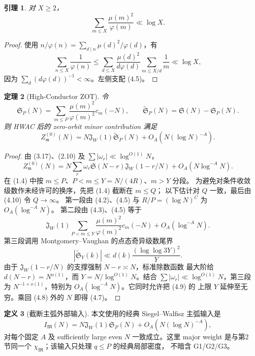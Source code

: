 \documentclass[11pt,a4paper]{ctexart}
\newtheorem{theorem}{定理}[section]
\newtheorem{lemma}[theorem]{引理}
\theoremstyle{definition}
\newtheorem{definition}[theorem]{定义}
\newcommand{\1}{\mathbf 1}
\begin{document}
\begin{lemma}
对 $X\ge2$，
\[
\sum_{m\le X}\frac{\mu(m)^2}{\varphi(m)}\ll\log X.     \tag{4.5}
\]
\end{lemma}

\begin{proof}
使用 $n/\varphi(n)=\sum_{d\mid n}\mu(d)^2/\varphi(d)$，有
\[
\sum_{n\le X}\frac1{\varphi(n)}
\le\sum_{d\le X}\frac{\mu(d)^2}{d\varphi(d)}
\sum_{m\le X/d}\frac1m\ll\log X,
\]
因为 $\sum_d(d\varphi(d))^{-1}<\infty$。左侧支配 (4.5)。
\end{proof}

\begin{theorem}[High-Conductor ZOT]
令
\[
\mathfrak S_P(N)=\sum_{m\le P}\frac{\mu(m)^2}{\varphi(m)^2}c_m(-N),
\qquad
\widetilde{\mathfrak S}_P(N)=\mathfrak S(N)-\mathfrak S_P(N). \tag{4.6}
\]
则 HWAC 后的 zero-orbit minor contribution 满足
\[
\boxed{
Z_{\mathfrak m}^{(0)}(N)
=N\mathfrak J_W(1)\widetilde{\mathfrak S}_P(N)
+O_A(N(\log N)^{-A}).}                                 \tag{4.7}
\]
\end{theorem}

\begin{proof}
由 (3.17)、(2.10) 及 $\sum|\omega_r|\ll\log^{O(1)}N$，
\[
Z_{\mathfrak m}^{(0)}(N)
=N\sum_r\omega_r\mathfrak S(N-r)\mathfrak J_W(1-r/N)
+O_A(N\log^{-A}N).                                     \tag{4.8}
\]
在 (1.4) 中按 $m\le P$、$P<m\le Y=N/(4R)$、$m>Y$ 分段。
为避免对条件收敛级数作未经许可的换序，先把 (1.4) 截断在 $m\le Q$；
以下估计对 $Q$ 一致，最后由 (4.10) 令 $Q\to\infty$。
第一段由 (4.2)、(4.5) 与 $R/P=(\log N)^C$ 为 $O_A(\log^{-A}N)$。
第二段由 (4.3)、(4.5) 等于
\[
\mathfrak J_W(1)\sum_{P<m\le Y}
\frac{\mu(m)^2}{\varphi(m)^2}c_m(-N)+O_A(\log^{-A}N). \tag{4.9}
\]
第三段调用 Montgomery--Vaughan 的点态奇异级数尾界
\[
|\widetilde{\mathfrak S}_Y(k)|
\ll d(k)\frac{(\log\log 3Y)^2}{Y}.                     \tag{4.10}
\]
由于 $\mathfrak J_W(1-r/N)$ 的支撑强制 $N-r\asymp N$，标准除数函数
最大阶给 $d(N-r)=N^{o(1)}$，而 $Y=N/\log^{O(1)}N$。结合
$\sum|\omega_r|\ll\log^{O(1)}N$，第三段为
$N^{-1+o(1)}$，特别为 $O_A(\log^{-A}N)$。它同时允许把 (4.9) 的
上限 $Y$ 延伸至无穷。乘回 (4.8) 外的 $N$ 即得 (4.7)。
\end{proof}

\begin{definition}[截断主弧外部输入]
本文使用的经典 Siegel--Walfisz 主弧输入是
\[
I_{\mathfrak M}(N)
=N\mathfrak J_W(1)\mathfrak S_P(N)
+O_A(N(\log N)^{-A}),                                  \tag{MA$_P$}
\]
对每个固定 $A$ 及 sufficiently large even $N$ 一致成立。这里 major weight
是与第2节同一个 $\chi_{\mathfrak M}$；该输入只处理 $q\le P$ 的经典局部密度，
不暗含 G1/G2/G3。
\end{definition}
\end{document}
